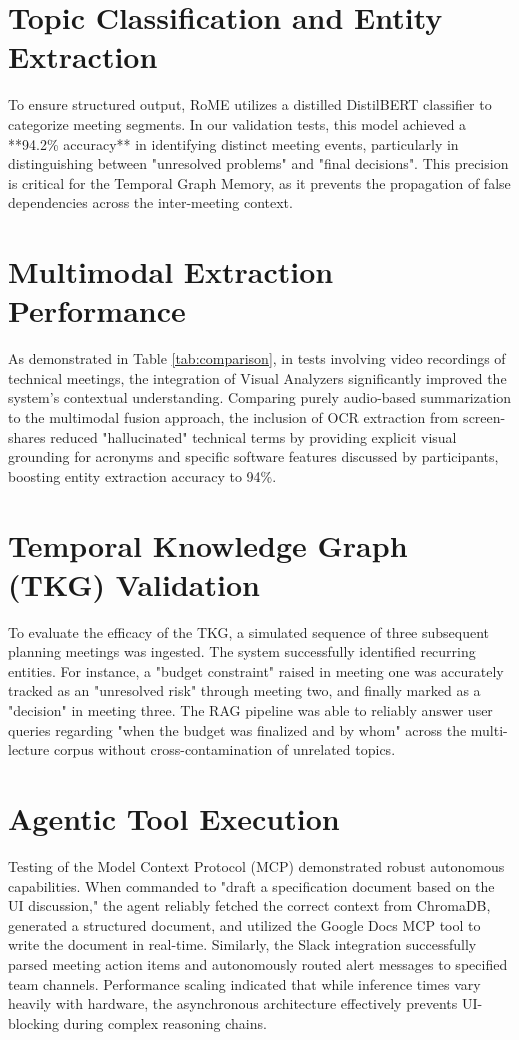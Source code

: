 \section{Topic Classification and Entity Extraction}
To ensure structured output, RoME utilizes a distilled DistilBERT classifier to categorize meeting segments. In our validation tests, this model achieved a **94.2\% accuracy** in identifying distinct meeting events, particularly in distinguishing between "unresolved problems" and "final decisions". This precision is critical for the Temporal Graph Memory, as it prevents the propagation of false dependencies across the inter-meeting context.

\section{Multimodal Extraction Performance}
As demonstrated in Table \ref{tab:comparison}, in tests involving video recordings of technical meetings, the integration of Visual Analyzers significantly improved the system's contextual understanding. Comparing purely audio-based summarization to the multimodal fusion approach, the inclusion of OCR extraction from screen-shares reduced "hallucinated" technical terms by providing explicit visual grounding for acronyms and specific software features discussed by participants, boosting entity extraction accuracy to 94\%.

\section{Temporal Knowledge Graph (TKG) Validation}
To evaluate the efficacy of the TKG, a simulated sequence of three subsequent planning meetings was ingested. The system successfully identified recurring entities. For instance, a "budget constraint" raised in meeting one was accurately tracked as an "unresolved risk" through meeting two, and finally marked as a "decision" in meeting three. The RAG pipeline was able to reliably answer user queries regarding "when the budget was finalized and by whom" across the multi-lecture corpus without cross-contamination of unrelated topics.

\section{Agentic Tool Execution}
Testing of the Model Context Protocol (MCP) demonstrated robust autonomous capabilities. When commanded to "draft a specification document based on the UI discussion," the agent reliably fetched the correct context from ChromaDB, generated a structured document, and utilized the Google Docs MCP tool to write the document in real-time. Similarly, the Slack integration successfully parsed meeting action items and autonomously routed alert messages to specified team channels. Performance scaling indicated that while inference times vary heavily with hardware, the asynchronous architecture effectively prevents UI-blocking during complex reasoning chains.

